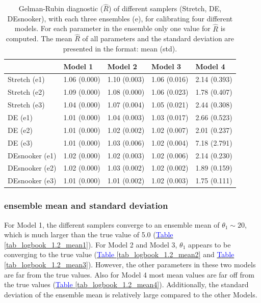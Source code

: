 \begin{table}[ht]
\caption{Gelman-Rubin diagnostic ($\hat{R}$) of different samplers (Stretch, DE, DEsnooker), with each three ensembles (e), for calibrating four different models. For each parameter in the ensemble only one value for $\hat{R}$ is computed. The mean $\hat{R}$ of all parameters and the standard deviation are presented in the format: mean (std).}
\label{tab_logbook_1.2_rhat}
\begin{tabularx}{\textwidth}{XXXXX}
\toprule
 & Model 1 & Model 2 & Model 3 & Model 4 \\
\midrule
Stretch (e1) & 1.06 (0.000) & 1.10 (0.003) & 1.06 (0.016) & 2.14 (0.393) \\
Stretch (e2) & 1.09 (0.000) & 1.08 (0.000) & 1.06 (0.023) & 1.78 (0.407) \\
Stretch (e3) & 1.04 (0.000) & 1.07 (0.004) & 1.05 (0.021) & 2.44 (0.308) \\
\midrule
DE (e1) & 1.01 (0.000) & 1.04 (0.003) & 1.03 (0.017) & 2.66 (0.523) \\
DE (e2) & 1.01 (0.000) & 1.02 (0.002) & 1.02 (0.007) & 2.01 (0.237) \\
DE (e3) & 1.01 (0.000) & 1.03 (0.006) & 1.02 (0.004) & 7.18 (2.791) \\
\midrule
DEsnooker (e1) & 1.02 (0.000) & 1.02 (0.003) & 1.02 (0.006) & 2.14 (0.230) \\
DEsnooker (e2) & 1.02 (0.000) & 1.03 (0.002) & 1.02 (0.002) & 1.89 (0.159) \\
DEsnooker (e3) & 1.01 (0.000) & 1.01 (0.002) & 1.02 (0.003) & 1.75 (0.111) \\
\bottomrule
\end{tabularx}
\end{table}

\subsubsection{ensemble mean and standard deviation}
For Model 1, the different samplers converge to an ensemble mean of $\theta_1 \sim 20$, which is much larger than the true value of 5.0 (\hyperref[tab_logbook_1.2_rhat]{\textcolor{blue}{Table }\ref{tab_logbook_1.2_mean1}}).
For Model 2 and Model 3, $\theta_1$ appears to be converging to the true value (\hyperref[tab_logbook_1.2_rhat]{\textcolor{blue}{Table }\ref{tab_logbook_1.2_mean2}} and \hyperref[tab_logbook_1.2_rhat]{\textcolor{blue}{Table }\ref{tab_logbook_1.2_mean3}}). However, the other parameters in these two models are far from the true values. 
Also for Model 4 most mean values are far off from the true values (\hyperref[tab_logbook_1.2_rhat]{\textcolor{blue}{Table }\ref{tab_logbook_1.2_mean4}}). Additionally, the standard deviation of the ensemble mean is relatively large compared to the other Models. 

